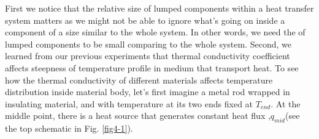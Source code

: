 First we notice that the relative size of lumped components within a heat transfer system matters as we might not be able to ignore what's going on inside a component of a size similar to the whole system. In other words, we need the  of lumped components to be small comparing to the whole system. Second, we learned from our previous experiments that thermal conductivity coefficient affects steepness of temperature profile in medium that transport heat. To see how the thermal conductivity of different materials affects temperature distribution inside material body, let's first imagine a metal rod wrapped in insulating material, and with temperature at its two ends fixed at $T_{end}$. At the middle point, there is a heat source that generates constant heat flux ,$q_{mid}$(see the top schematic in Fig. \ref{fig4-1}). 
